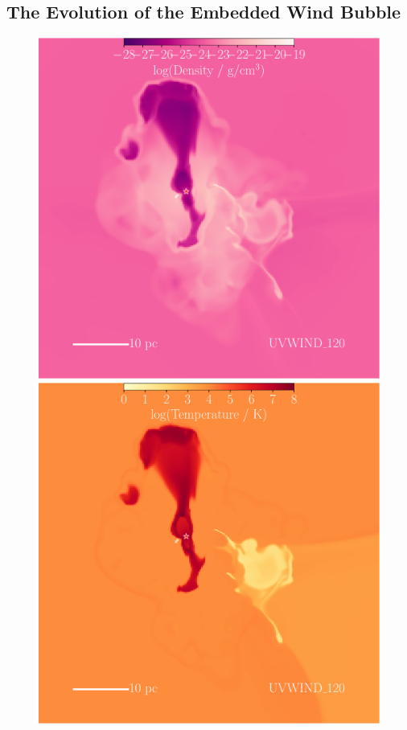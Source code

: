 \documentclass[a4paper,fleqn,usenatbib]{mnras}
\begin{document}
\subsection{The Evolution of the Embedded Wind Bubble}
\label{results:evolutionwindbubble}

\begin{figure}
	\centerline{\includegraphics[width=0.80\columnwidth]{plots/fig4a.pdf} \includegraphics[width=0.80\columnwidth]{plots/fig4b.pdf}}

\end{figure}
\end{document}
